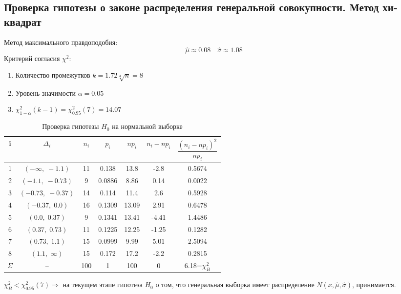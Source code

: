 \documentclass[a4paper,12pt]{article} %
\begin{document}
\subsection{Проверка гипотезы о законе распределения генеральной совокупности. Метод хи-квадрат}
Метод максимального правдоподобия:
$$\hat{\mu}\approx0.08\quad\hat{\sigma}\approx1.08$$
Критерий согласия $\chi^2$:
\begin{enumerate}
    \item Количество промежутков $k=1.72\sqrt[3]{n}=8$
    \item Уровень значимости $\alpha=0.05$
    \item $\chi^2_{1-\alpha}(k-1)=\chi^2_{0.95}(7)=14.07$
\end{enumerate}
\begin{table}[H]
    \centering
    \begin{tabular}{|c|c|c|c|c|c|c|}
    \hline
    i&$\Delta_i$&$n_i$&$p_i$&$np_i$&$n_i-np_i$&$\dfrac{(n_i-np_i)^2}{np_i}$\\
    \hline
    1&$(-\infty,\;-1.1)$&11&0.138&13.8&-2.8&0.5674\\
    \hline
    2&$(-1.1,\;-0.73)$&9&0.0886&8.86&0.14&0.0022\\
    \hline
    3&$(-0.73,\;-0.37)$&14&0.114&11.4&2.6&0.5928\\
    \hline
    4&$(-0.37,\;0.0)$&16&0.1309&13.09&2.91&0.6478\\
    \hline
    5&$(0.0,\;0.37)$&9&0.1341&13.41&-4.41&1.4486\\
    \hline
    6&$(0.37,\;0.73)$&11&0.1225&12.25&-1.25&0.1282\\
    \hline
    7&$(0.73,\;1.1)$&15&0.0999&9.99&5.01&2.5094\\
    \hline
    8&$(1.1,\;\infty)$&15&0.172&17.2&-2.2&0.2815\\
    \hline
    $\Sigma$&--&100&1&100&0&6.18=$\chi^2_B$\\
    \hline
    \end{tabular}
    \caption{Проверка гипотезы $H_0$ на нормальной выборке}
    \label{tab:tab1}
\end{table}
$\chi^2_B<\chi^2_{0.95}(7)\Rightarrow$ на текущем этапе гипотеза $H_0$ о том, что генеральная выборка имеет распределение $N(x,\hat{\mu},\hat{\sigma})$, принимается.
\end{document}
